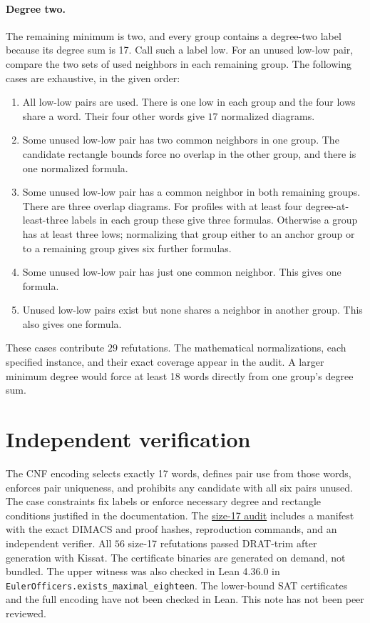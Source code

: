 \documentclass[11pt,letterpaper]{article}
\begin{document}
\paragraph{Degree two.}
The remaining minimum is two, and every group contains a degree-two label
because its degree sum is 17. Call such a label low. For an unused low-low
pair, compare the two sets of used neighbors in each remaining group.
The following cases are exhaustive, in the given order:
\begin{enumerate}
\item All low-low pairs are used. There is one low in each group and
      the four lows share a word. Their four other words give $17$
      normalized diagrams.
\item Some unused low-low pair has two common neighbors in one group.
      The candidate rectangle bounds force no overlap in the other group,
      and there is one normalized formula.
\item Some unused low-low pair has a common neighbor in both remaining
      groups. There are three overlap diagrams. For profiles with at
      least four degree-at-least-three labels in each group these give
      three formulas. Otherwise a group has at least three lows;
      normalizing that group either to an anchor group or to a remaining
      group gives six further formulas.
\item Some unused low-low pair has just one common neighbor. This gives
      one formula.
\item Unused low-low pairs exist but none shares a neighbor in another
      group. This also gives one formula.
\end{enumerate}
These cases contribute $29$ refutations. The mathematical
normalizations, each specified instance, and their exact coverage appear
in the audit. A larger minimum degree would force at least 18 words
directly from one group's degree sum.

\section{Independent verification}
The CNF encoding selects exactly 17 words, defines pair use from those
words, enforces pair uniqueness, and prohibits any candidate with all
six pairs unused. The case constraints fix labels or enforce necessary
degree and rectangle conditions justified in the documentation. The
\href{https://github.com/Aafimalek/novel-discoveries/tree/research/euler-order16/euler-36-officers-disconnected/verification/order17-exact}{size-17
audit} includes a manifest with the exact DIMACS and proof hashes,
reproduction commands, and an independent verifier. All $56$
size-17 refutations passed DRAT-trim after generation with Kissat.
The certificate binaries are generated on demand, not bundled.
The upper witness was also checked in Lean 4.36.0 in
\texttt{EulerOfficers.exists\_maximal\_eighteen}. The lower-bound SAT
certificates and the full encoding have not been checked in Lean.
This note has not been peer reviewed.
\end{document}
